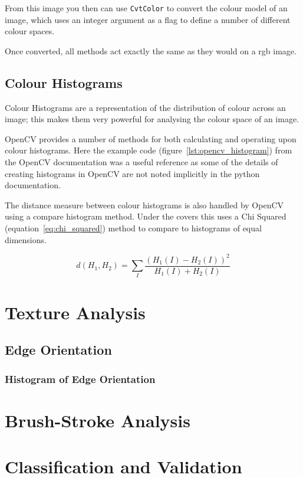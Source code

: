 From this image you then can use \texttt{CvtColor} to convert the colour model of an image, which 
uses an integer argument as a flag to define a number of different colour spaces.

Once converted, all methods act exactly the same as they would on a \gls{rgb} image.

\subsection{Colour Histograms}
Colour Histograms are a representation of the distribution of colour across an image; this makes
them very powerful for analysing the colour space of an image.

OpenCV provides a number of methods for both calculating and operating upon colour histograms. 
Here the example code (figure~\ref{lst:opencv_histogram}) from the OpenCV documentation was a
useful reference as some of the details of creating histograms in OpenCV are not noted implicitly
in the python documentation.

The distance measure between colour histograms is also handled by OpenCV using a compare histogram
method. Under the covers this uses a Chi Squared (equation~\ref{eq:chi_squared}) method to
compare to histograms of equal dimensions.

\begin{equation}\label{eq:chi_squared}
d(H_1,H_2) =\sum_I{\frac{(H_1(I) - H_2(I))^2}{H_1(I) + H_2(I)}}
\end{equation}


\section{Texture Analysis}

\subsection{Edge Orientation}
\subsubsection{Histogram of Edge Orientation}


\section{Brush-Stroke Analysis}


\section{Classification and Validation}

